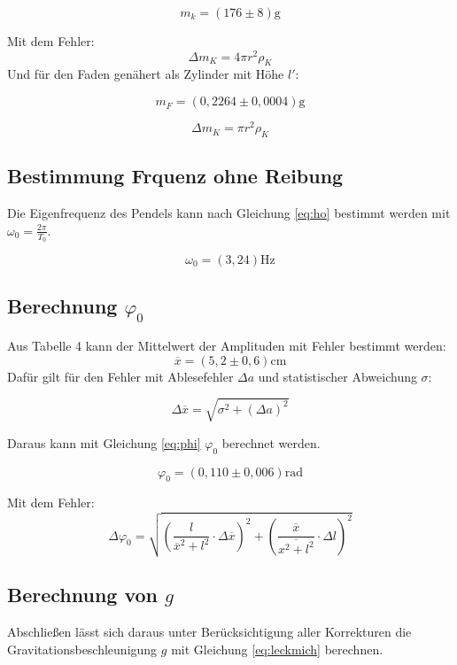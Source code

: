 \[m_k = (176 \pm 8) \si{\gram}\]

Mit dem Fehler:
\begin{equation}
    \Delta m_K = 4\pi r^2 \rho_K
\end{equation}
Und für den Faden genähert als Zylinder mit Höhe $l'$:

\[m_F = (0,2264 \pm 0,0004) \si{\gram}\]

\begin{equation}
    \Delta m_K = \pi r^2 \rho_K
\end{equation}

\subsection{Bestimmung Frquenz ohne Reibung}
Die Eigenfrequenz des Pendels kann nach Gleichung \ref{eq:ho} bestimmt werden mit $\omega_0 = \tfrac{2\pi}{T_0}$. 

\[ \omega_0 = (3,24 ) \si{\Hz} \]

\subsection{Berechnung $\varphi_0$}
Aus Tabelle 4 kann der Mittelwert der Amplituden mit Fehler bestimmt werden:
\[ \overline{x} = (5,2 \pm 0,6) \si{\cm}\]
Dafür gilt für den Fehler mit Ablesefehler $\Delta a$ und statistischer Abweichung $\sigma$:

\begin{equation}
    \Delta \overline{x} = \sqrt{\sigma^2 + (\Delta a)^2}
\end{equation}

Daraus kann mit Gleichung \ref{eq:phi} $\varphi_0$ berechnet werden.

\[\varphi_0 =( 0,110 \pm 0,006 )\si{\text{rad}}\]

Mit dem Fehler:
\begin{equation}
\Delta \varphi_{0} = 
\sqrt{ \left( \frac{l}{\overline{x}^{2} + l^{2}} \cdot \Delta \overline{x} \right)^{2} 
    + \left( \frac{\overline{x}}{\overline{x^{2} + l^{2}}} \cdot \Delta l \right)^{2} }
\end{equation}

\subsection{Berechnung von $g$}

Abschließen lässt sich daraus unter Berücksichtigung aller Korrekturen die Gravitationsbeschleunigung $g$ mit Gleichung \ref{eq:leckmich} berechnen.

